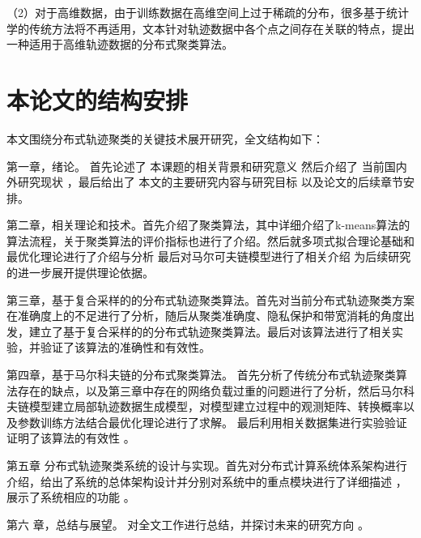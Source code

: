 （2）对于高维数据，由于训练数据在高维空间上过于稀疏的分布，很多基于统计学的传统方法将不再适用，文本针对轨迹数据中各个点之间存在关联的特点，提出一种适用于高维轨迹数据的分布式聚类算法。


\section{本论文的结构安排}
本文围绕分布式轨迹聚类的关键技术展开研究，全文结构如下：

第一章，绪论。 首先论述了 本课题的相关背景和研究意义 然后介绍了 当前国内外研究现状 ，最后给出了 本文的主要研究内容与研究目标 以及论文的后续章节安排。

第二章，相关理论和技术。首先介绍了聚类算法，其中详细介绍了k-means算法的算法流程，关于聚类算法的评价指标也进行了介绍。然后就多项式拟合理论基础和最优化理论进行了介绍与分析 最后对马尔可夫链模型进行了相关介绍 为后续研究的进一步展开提供理论依据。

第三章，基于复合采样的的分布式轨迹聚类算法。首先对当前分布式轨迹聚类方案在准确度上的不足进行了分析，随后从聚类准确度、隐私保护和带宽消耗的角度出发，建立了基于复合采样的的分布式轨迹聚类算法。最后对该算法进行了相关实验，并验证了该算法的准确性和有效性。

第四章，基于马尔科夫链的分布式聚类算法。 首先分析了传统分布式轨迹聚类算法存在的缺点，以及第三章中存在的网络负载过重的问题进行了分析，然后马尔科夫链模型建立局部轨迹数据生成模型，对模型建立过程中的观测矩阵、转换概率以及参数训练方法结合最优化理论进行了求解。 最后利用相关数据集进行实验验证证明了该算法的有效性 。

第五章 分布式轨迹聚类系统的设计与实现。首先对分布式计算系统体系架构进行介绍，给出了系统的总体架构设计并分别对系统中的重点模块进行了详细描述 ，展示了系统相应的功能 。

第六 章，总结与展望。 对全文工作进行总结，并探讨未来的研究方向 。
